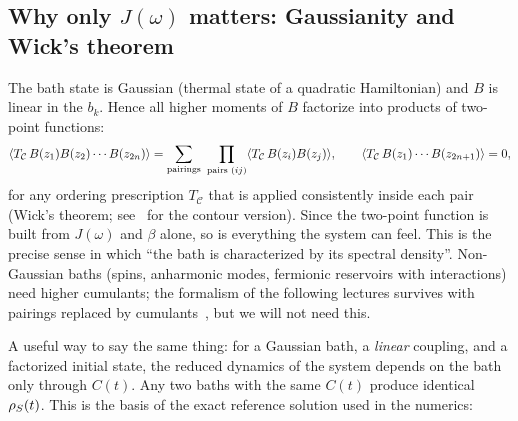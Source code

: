 \subsection{Why only \texorpdfstring{$J(\omega)$}{J(omega)} matters: Gaussianity and Wick's theorem}

The bath state is Gaussian (thermal state of a quadratic Hamiltonian) and $B$ is linear in the $b_k$.
Hence all higher moments of $B$ factorize into products of two-point functions:
\begin{equation}
  \langle T_{\mathcal C}\,B(z_1)B(z_2)\cdots B(z_{2n})\rangle=\sum_{\text{pairings}}\ \prod_{\text{pairs }(ij)}\langle T_{\mathcal C}\,B(z_i)B(z_j)\rangle,
  \qquad \langle T_{\mathcal C}\,B(z_1)\cdots B(z_{2n+1})\rangle=0 ,
  \label{eq:wick}
\end{equation}
for any ordering prescription $T_{\mathcal C}$ that is applied consistently inside each pair (Wick's theorem; see~\cite[Sec.~2.5]{Kamenev2011} for the contour version).
Since the two-point function is built from $J(\omega)$ and $\beta$ alone, so is everything the system can feel.
This is the precise sense in which ``the bath is characterized by its spectral density''.
Non-Gaussian baths (spins, anharmonic modes, fermionic reservoirs with interactions) need higher cumulants; the formalism of the following lectures survives with pairings replaced by cumulants~\cite{Schoeller2009}, but we will not need this.

A useful way to say the same thing: for a Gaussian bath, a \emph{linear} coupling, and a factorized initial state, the reduced dynamics of the system depends on the bath only through $C(t)$.
Any two baths with the same $C(t)$ produce identical $\rho_{S}(t)$.
This is the basis of the exact reference solution used in the numerics:

